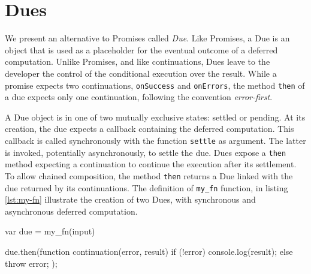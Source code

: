 

\section{Dues} \label{section:due}

We present an alternative to Promises called \textit{Due}.
Like Promises, a Due is an object that is used as a placeholder for the eventual outcome of a deferred computation.
Unlike Promises, and like continuations, Dues leave to the developer the control of the conditional execution over the result.
While a promise expects two continuations, \texttt{onSuccess} and \texttt{onErrors}, the method \texttt{then} of a due expects only one continuation, following the convention \textit{error-first}.

A Due object is in one of two mutually exclusive states: settled or pending.
At its creation, the due expects a callback containing the deferred computation.
This callback is called synchronously with the function \texttt{settle} as argument.
The latter is invoked, potentially asynchronously, to settle the due.
Dues expose a \texttt{then} method expecting a continuation to continue the execution after its settlement.
To allow chained composition, the method \texttt{then} returns a Due linked with the due returned by its continuations.
The definition of \texttt{my\_fn} function, in listing \ref{lst:my-fn} illustrate the creation of two Dues, with synchronous and asynchronous deferred computation.

\begin{code}[js, %
             caption={Example of a due}, %
             label={lst:due}] %
var due = my_fn(input)

due.then(function continuation(error, result) {
  if (!error) {
    console.log(result);
  } else {
    throw error;
  }
});
\end{code}

